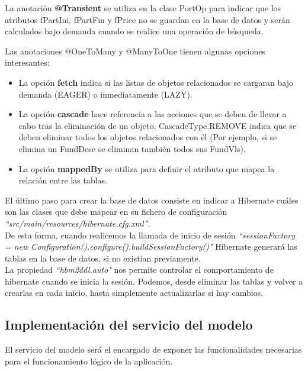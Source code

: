\documentclass[12pt, a4paper]{article}
\begin{document}
La anotación \textbf{@Transient} se utiliza en la clase PortOp para indicar que los atributos fPartIni, fPartFin y fPrice no se guardan en la base de datos y serán calculados bajo demanda cuando se realice una operación de búsqueda.

\newpage
Las anotaciones @OneToMany y @ManyToOne tienen algunas opciones interesantes:
\begin{itemize}
	\item La opción \textbf{fetch} indica si las listas de objetos relacionados se cargaran bajo demanda (EAGER) o inmediatamente (LAZY).
	\item La opción \textbf{cascade} hace referencia a las acciones que se deben de llevar a cabo tras la eliminación de un objeto, CascadeType.REMOVE indica que se deben eliminar todos los objetos relacionados con él (Por ejemplo, si se elimina un FundDesc se eliminan también todos sus FundVls).
	\item La opción \textbf{mappedBy} se utiliza para definir el atributo que mapea la relación entre las tablas.\\
\end{itemize}

 El último paso para crear la base de datos consiste en indicar a Hibernate cuáles son las clases que debe mapear en su fichero de configuración \textit{``src/main/resources/hibernate.cfg.xml''}.\\
 
  De esta forma, cuando realicemos la llamada de inicio de sesión \textit{``sessionFactory = new Configuration().configure().buildSessionFactory()"} Hibernate generará las tablas en la base de datos, si no existían previamente.\\
 
  La propiedad \textit{``hbm2ddl.auto"} nos permite controlar el comportamiento de hibernate cuando se inicia la sesión. Podemos, desde eliminar las tablas y volver a crearlas en cada inicio, hasta simplemente actualizarlas si hay cambios.

\newpage

\subsection{Implementación del servicio del modelo}

El servicio del modelo será el encargado de exponer las funcionalidades necesarias para el funcionamiento lógico de la aplicación.\\
\end{document}
